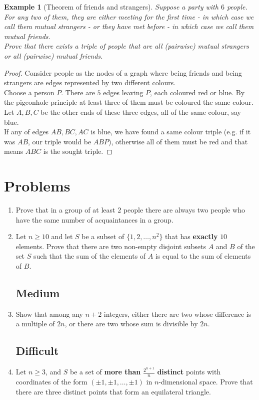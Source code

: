 \documentclass[12pt,a4paper]{article}
\newtheorem{theorem}{Example}
\begin{document}
\begin{theorem}[Theorem of friends and strangers]
Suppose a party with $6$ people. For any two of them, they are either meeting for the first time - in which case we call them mutual strangers - or they have met before - in which case we call them mutual friends.\\
Prove that there exists a triple of people that are all (pairwise) mutual strangers or all (pairwise) mutual friends.
\end{theorem}
\begin{proof}
Consider people as the nodes of a graph where being friends and being strangers are edges represented by two different colours.\\
Choose a person $P$. There are $5$ edges leaving $P$, each coloured red or blue. By the pigeonhole principle at least three of them must be coloured the same colour. Let $A,B,C$ be the other ends of these three edges, all of the same colour, say blue.\\
If any of edges $AB, BC, AC$ is blue, we have found a same colour triple (e.g. if it was $AB$, our triple would be $ABP$), otherwise all of them must be red and that means $ABC$ is the sought triple.
\end{proof}

\section{Problems}

\begin{enumerate}
	\subsection*{Easy}
	\item{Prove that in a group of at least $2$ people there are always two people who have the same number of acquaintances in a group.}
	
	\item{Let $n\geq10$ and let $S$ be a subset of $\{1,2,\dots,n^{2}\}$} that has \textbf{exactly} $10$ elements. Prove that there are two non-empty disjoint subsets $A$ and $B$ of the set $S$ such that the sum of the elements of $A$ is equal to the sum of elements of $B$.
	
	\subsection*{Medium}
	\item{Show that among any $n+2$ integers, either there are two whose difference is a multiple of $2n$, or there are two whose sum is divisible by $2n$.}

	\subsection*{Difficult}
	\item{Let $n\geq3$, and $S$ be a set of \textbf{more than} $\frac{2^{n+1}}{n}$ \textbf{distinct} points with coordinates of the form $(\pm1,\pm1,\dots,\pm1)$ in $n$-dimensional space. Prove that there are three distinct points that form an equilateral triangle.}
	
\end{enumerate}
\end{document}
